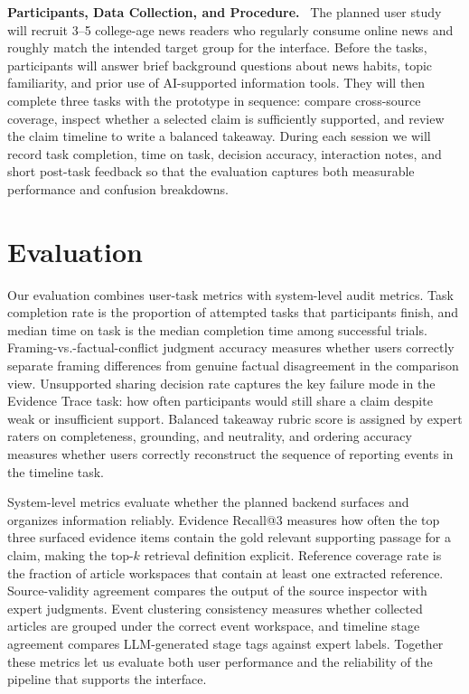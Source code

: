\documentclass{vgtc}                          %
\newcommand{\methodsubhead}[1]{\vspace{0.55em}\noindent\textbf{#1.}\ }
\begin{document}
\methodsubhead{Participants, Data Collection, and Procedure}
The planned user study will recruit 3--5 college-age news readers who regularly consume online news and roughly match the intended target group for the interface. Before the tasks, participants will answer brief background questions about news habits, topic familiarity, and prior use of AI-supported information tools. They will then complete three tasks with the prototype in sequence: compare cross-source coverage, inspect whether a selected claim is sufficiently supported, and review the claim timeline to write a balanced takeaway. During each session we will record task completion, time on task, decision accuracy, interaction notes, and short post-task feedback so that the evaluation captures both measurable performance and confusion breakdowns.

\section{Evaluation}

Our evaluation combines user-task metrics with system-level audit metrics. Task completion rate is the proportion of attempted tasks that participants finish, and median time on task is the median completion time among successful trials. Framing-vs.-factual-conflict judgment accuracy measures whether users correctly separate framing differences from genuine factual disagreement in the comparison view. Unsupported sharing decision rate captures the key failure mode in the Evidence Trace task: how often participants would still share a claim despite weak or insufficient support. Balanced takeaway rubric score is assigned by expert raters on completeness, grounding, and neutrality, and ordering accuracy measures whether users correctly reconstruct the sequence of reporting events in the timeline task.

System-level metrics evaluate whether the planned backend surfaces and organizes information reliably. Evidence Recall@3 measures how often the top three surfaced evidence items contain the gold relevant supporting passage for a claim, making the top-$k$ retrieval definition explicit. Reference coverage rate is the fraction of article workspaces that contain at least one extracted reference. Source-validity agreement compares the output of the source inspector with expert judgments. Event clustering consistency measures whether collected articles are grouped under the correct event workspace, and timeline stage agreement compares LLM-generated stage tags against expert labels. Together these metrics let us evaluate both user performance and the reliability of the pipeline that supports the interface.
\end{document}
